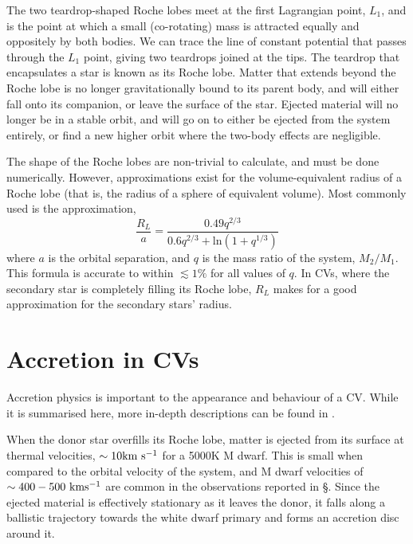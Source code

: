 The two teardrop-shaped Roche lobes meet at the first Lagrangian point, $L_1$, and is the point at which a small (co-rotating) mass is attracted equally and oppositely by both bodies. We can trace the line of constant potential that passes through the $L_1$ point, giving two teardrops joined at the tips. The teardrop that encapsulates a star is known as its Roche lobe. Matter that extends beyond the Roche lobe is no longer gravitationally bound to its parent body, and will either fall onto its companion, or leave the surface of the star. Ejected material will no longer be in a stable orbit, and will go on to either be ejected from the system entirely, or find a new higher orbit where the two-body effects are negligible.

The shape of the Roche lobes are non-trivial to calculate, and must be done numerically. However, approximations exist for the volume-equivalent radius of a Roche lobe (that is, the radius of a sphere of equivalent volume). Most commonly used is the \citet{Eggleton1983} approximation,
\begin{equation}
    \label{eqn:introduction:eggleton approximation}
    \frac{R_L}{a} = \frac{0.49 q^{2/3}}{0.6 q^{2/3} + \mathrm{ln}(1 + q^{1/3})}
\end{equation}
where $a$ is the orbital separation, and $q$ is the mass ratio of the system, $M_2 / M_1$. This formula is accurate to within $\lesssim 1\%$ for all values of $q$. In CVs, where the secondary star is completely filling its Roche lobe, $R_L$ makes for a good approximation for the secondary stars' radius.


\section{Accretion in CVs}
\label{sect:introduction:accretion}
Accretion physics is important to the appearance and behaviour of a CV. While it is summarised here, more in-depth descriptions can be found in \citet{warner1995, hellier2001, ritter2010}.

When the donor star overfills its Roche lobe, matter is ejected from its surface at thermal velocities, $\sim 10 \rm km\ s^{-1}$ for a 5000K M dwarf. This is small when compared to the orbital velocity of the system, and M dwarf velocities of $\sim 400-500 \rm\ km s^{-1}$ are common in the observations reported in \S{}. Since the ejected material is effectively stationary as it leaves the donor, it falls along a ballistic trajectory towards the white dwarf primary and forms an accretion disc around it. 

